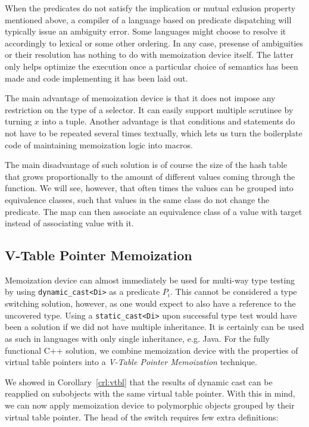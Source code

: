 \documentclass[preprint]{sigplanconf}
\makeatletter
\DeclareRobustCommand{\code}[1]{{\lstinline[breaklines=false,escapechar=@]{#1}}}
\makeatother
\begin{document}
When the predicates do not satisfy the implication or mutual exlusion property 
mentioned above, a compiler of a language based on predicate dispatching will 
typically issue an ambiguity error. Some languages might choose to resolve it 
accordingly to lexical or some other ordering. In any case, presense of 
ambiguities or their resolution has nothing to do with memoization device 
itself. The latter only helps optimize the execution once a particular choice of 
semantics has been made and code implementing it has been laid out.

The main advantage of memoization device is that it does not impose any 
restriction on the type of a selector. It can easily support multiple scrutinee 
by turning $x$ into a tuple. Another advantage is that conditions and statements 
do not have to be repeated several times textually, which lets us turn the 
boilerplate code of maintaining memoization logic into macros.

The main disadvantage of such solution is of course the size of the hash table 
that grows proportionally to the amount of different values coming through the 
function. We will see, however, that often times the values can be grouped into 
equivalence classes, such that values in the same class do not change the 
predicate. The map can then associate an equivalence class of a value with 
target instead of associating value with it.

\subsection{V-Table Pointer Memoization}
\label{sec:vtblmem}

Memoization device can almost immediately be used for multi-way type testing by 
using \code{dynamic_cast<Di>} as a predicate $P_i$. This cannot be considered a 
type switching solution, however, as one would expect to also have a reference 
to the uncovered type. Using a \code{static_cast<Di>} upon successful type test 
would have been a solution if we did not have multiple inheritance. It is 
certainly can be used as such in languages with only single inheritance, e.g. 
Java. For the fully functional C++ solution, we combine memoization device with 
the properties of virtual table pointers into a \emph{V-Table Pointer 
Memoization} technique.

We showed in Corollary~\ref{crl:vtbl} that the results of dynamic cast can be 
reapplied on subobjects with the same virtual table pointer. With this in mind, 
we can now apply memoization device to polymorphic objects grouped by their 
virtual table pointer. The head of the switch requires few extra definitions:
\end{document}
